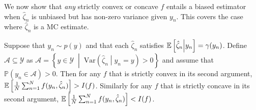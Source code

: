 %
%
We now show that 
\emph{any}
strictly convex or concave $f$ entails a biased estimator 
when $\hat{\zeta}_n$ is unbiased but has non-zero variance
given $y_n$. This covers the
case where $\hat{\zeta}_n$ is a MC estimate.
\begin{theorem}
  \label{the:bias-conv}	
  Suppose that $y_n \sim p(y)$ and that each $\hat{\zeta}_n$ satisfies $\mathbb{E} \left[\hat{\zeta}_n \middle| y_n\right] = \gamma(y_n)$.
  Define $\mathcal{A} \subseteq \mathcal{Y}$ as
  $\mathcal{A} = \left\{y \in \mathcal{Y} \;\middle|\; \mathrm{Var}\left(\hat{\zeta}_n \middle| y_n=y \right)>0\right\}$
  and assume that ~$\mathbb{P}(y_n \in \mathcal{A}) > 0$.
  Then for any $f$ that is strictly convex in its second argument,
	$\mathbb{E}\left[\frac{1}{N} \sum_{n=1}^N f(y_n, \hat{\zeta}_n)\right] > I(f)$.
  Similarly for any $f$ that is strictly concave in its second argument, 
		$\mathbb{E}\left[\frac{1}{N} \sum_{n=1}^N f(y_n, \hat{\zeta}_n)\right] < I(f)$.
\end{theorem}
